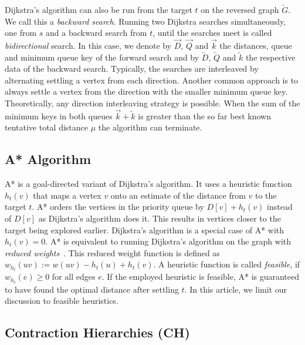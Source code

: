 \documentclass[manuscript,review]{acmart}
\begin{document}
Dijkstra's algorithm can also be run from the target $t$ on the reversed graph $\overleftarrow{G}$. %
We call this a \emph{backward search}.
Running two Dijkstra searches simultaneously, one from $s$ and a backward search from $t$, until the searches meet is called \emph{bidirectional} search.
In this case, we denote by $\overrightarrow{D}$, $\overrightarrow{Q}$ and $\overrightarrow{k}$ the distances, queue and minimum queue key of the forward search and by $\overleftarrow{D}$, $\overleftarrow{Q}$ and $\overleftarrow{k}$ the respective data of the backward search.
Typically, the searches are interleaved by alternating settling a vertex from each direction.
Another common approach is to always settle a vertex from the direction with the smaller minimum queue key.
Theoretically, any direction interleaving strategy is possible.
When the sum of the minimum keys in both queues $\overrightarrow{k} + \overleftarrow{k}$ is greater than the so far best known tentative total distance $\mu$ the algorithm can terminate.

\subsection{A* Algorithm}\label{sec:a_star}

A* is a goal-directed variant of Dijkstra's algorithm.
It uses a heuristic function $h_t(v)$ that maps a vertex $v$ onto an estimate of the distance from $v$ to the target $t$.
A* orders the vertices in the priority queue by $D[v] + h_t(v)$ instead of $D[v]$ as Dijkstra's algorithm does it.
This results in vertices closer to the target being explored earlier.
Dijkstra's algorithm is a special case of A* with $h_t(v)=0$.
A* is equivalent to running Dijkstra's algorithm on the graph with \emph{reduced weights}~\cite{hnr-afbhd-68}.
This reduced weight function is defined as $w_{h_t}(uv) := w(uv) - h_t(u) + h_t(v)$.
A heuristic function is called \emph{feasible}, if $w_{h_t}(e) \geq 0$ for all edges $e$.
If the employed heuristic is feasible, A* is guaranteed to have found the optimal distance after settling $t$.
In this article, we limit our discussion to feasible heuristics.

\subsection{Contraction Hierarchies (CH)}
\end{document}

